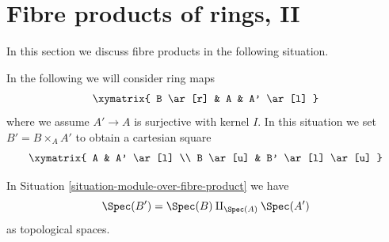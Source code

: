 \section{Fibre products of rings, II}
\label{section-fibre-products-rings-II}

\noindent
In this section we discuss fibre products in the following situation.

\begin{situation}
\label{situation-module-over-fibre-product}
In the following we will consider ring maps
$$
\xymatrix{
B \ar[r] & A & A' \ar[l]
}
$$
where we assume $A' \to A$ is surjective with kernel $I$.
In this situation we set $B' = B \times_A A'$ to
obtain a cartesian square
$$
\xymatrix{
A & A' \ar[l] \\
B \ar[u] & B' \ar[l] \ar[u]
}
$$
\end{situation}

\begin{lemma}
\label{lemma-points-of-fibre-product}
In Situation \ref{situation-module-over-fibre-product}
we have
$$
\Spec(B') = \Spec(B) \amalg_{\Spec(A)} \Spec(A')
$$
as topological spaces.
\end{lemma}

